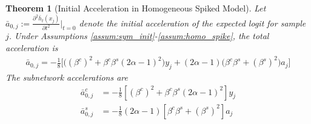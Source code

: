 \documentclass[letter,11pt]{article}
\newtheorem{theorem}{Theorem}
\begin{document}
\begin{theorem}[Initial Acceleration in Homogeneous Spiked Model]\label{thm:homo_acceleration}
    Let $\bar{a}_{0,j} := \frac{\partial^2 \bar{h}_t(x_j)}{\partial t^2} \Big|_{t=0}$ denote the initial acceleration of the expected logit for sample $j$. Under Assumptions \ref{assum:sym_init}-\ref{assum:homo_spike}, the total acceleration is
    \begin{align}
    \bar{a}_{0,j} = -\frac{1}{8} \Big[ \big( (\beta^c)^2 + \beta^c \beta^s (2\alpha - 1)^2 \big) y_j + (2\alpha - 1) \big( \beta^c \beta^s + (\beta^s)^2 \big) a_j \Big]
    \end{align}
    The subnetwork accelerations are
    \begin{align}
        \bar{a}_{0,j}^c &= -\frac{1}{8} \left[ (\beta^c)^2 + \beta^c \beta^s (2\alpha - 1)^2 \right] y_j \\
        \bar{a}_{0,j}^s &= -\frac{1}{8} (2\alpha - 1) \left[ \beta^c \beta^s + (\beta^s)^2 \right] a_j
    \end{align}
\end{theorem}
\end{document}
